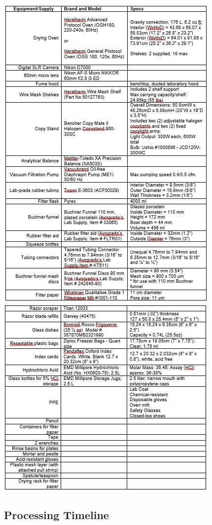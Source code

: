 \documentclass[]{book}
\begin{document}
\includegraphics{images/CauEquipment1.jpg}
\includegraphics{images/CauEquipment2.jpg}

\hypertarget{processing-timeline}{%
\subsection{Processing Timeline}\label{processing-timeline}}
\end{document}
